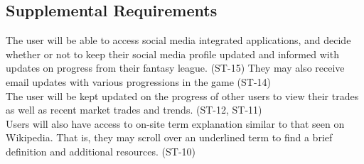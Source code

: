 \subsection{Supplemental Requirements}
The user will be able to access social media integrated applications, and decide whether
or not to keep their social media profile updated and informed with updates on progress from
their fantasy league. (ST-15) They may also receive email updates with various progressions in
the game (ST-14)\\

The user will be kept updated on the progress of other users to view their trades as well as
recent market trades and trends. (ST-12, ST-11)\\

Users will also have access to on-site term explanation similar to that seen on Wikipedia.
That is, they may scroll over an underlined term to find a brief definition and additional
resources. (ST-10)\\



